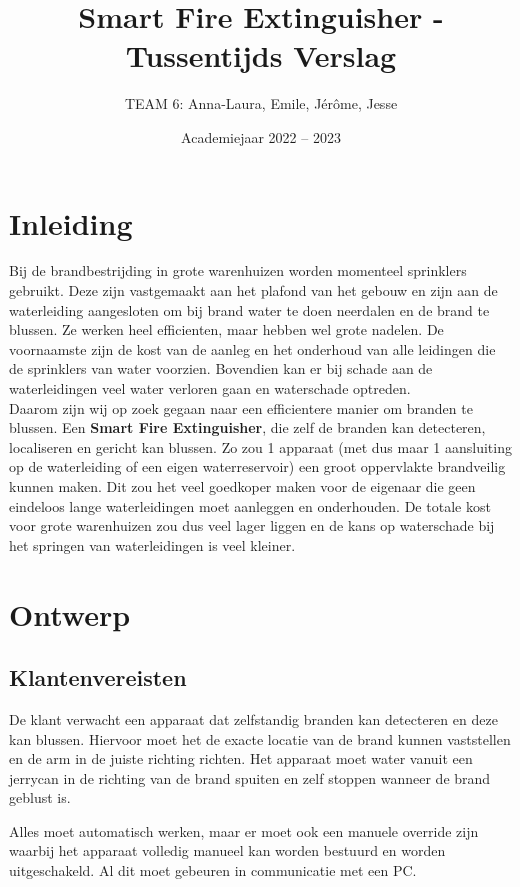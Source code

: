 \documentclass[kulak]{kulakarticle} %
\title{Smart Fire Extinguisher - Tussentijds Verslag}
\author{TEAM 6: Anna-Laura, Emile, Jérôme, Jesse}
\date{Academiejaar 2022 -- 2023}
\begin{document}
\maketitle

\section*{Inleiding}

Bij de brandbestrijding in grote warenhuizen worden momenteel sprinklers gebruikt. Deze zijn vastgemaakt aan het plafond van het gebouw en zijn aan de waterleiding aangesloten om bij brand water te doen neerdalen en de brand te blussen. Ze werken heel efficienten, maar hebben wel grote nadelen. De voornaamste zijn de kost van de aanleg en het onderhoud van alle leidingen die de sprinklers van water voorzien. Bovendien kan er bij schade aan de waterleidingen veel water verloren gaan en waterschade optreden. \\

Daarom zijn wij op zoek gegaan naar een efficientere manier om branden te blussen. Een \textbf{Smart Fire Extinguisher}, die zelf de branden kan detecteren, localiseren en gericht kan blussen. Zo zou 1 apparaat (met dus maar 1 aansluiting op de waterleiding of een eigen waterreservoir) een groot oppervlakte brandveilig kunnen maken. Dit zou het veel goedkoper maken voor de eigenaar die geen eindeloos lange waterleidingen moet aanleggen en onderhouden. De totale kost voor grote warenhuizen zou dus veel lager liggen en de kans op waterschade bij het springen van waterleidingen is veel kleiner.


\section{Ontwerp}
\subsection{Klantenvereisten}

De klant verwacht een apparaat dat zelfstandig branden kan detecteren en deze kan blussen. Hiervoor moet het de exacte locatie van de brand kunnen vaststellen en de arm in de juiste richting richten. Het apparaat moet water vanuit een jerrycan in de richting van de brand spuiten en zelf stoppen wanneer de brand geblust is. 

Alles moet automatisch werken, maar er moet ook een manuele override zijn waarbij het apparaat volledig manueel kan worden bestuurd en worden uitgeschakeld. Al dit moet gebeuren in communicatie met een PC. 
\end{document}
